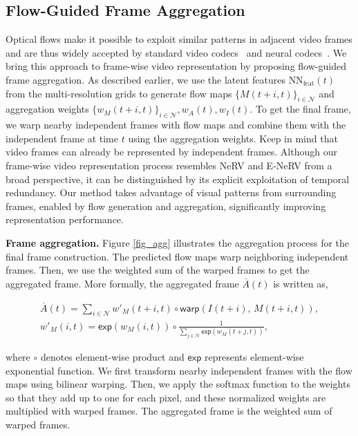 \documentclass[sigconf]{acmart}
\begin{document}
\subsection{Flow-Guided Frame Aggregation}
\label{ssec:flow_guided_agg}
Optical flows make it possible to exploit similar patterns in adjacent video frames and are thus widely accepted by standard video codecs~\cite{h264,hevc} and neural codecs~\cite{dvc,fvc,hybridcomp}.
We bring this approach to frame-wise video representation by proposing flow-guided frame aggregation.
As described earlier, we use the latent features $\textrm{NN}_{\textrm{feat}}(t)$ from the multi-resolution grids to generate flow maps $\{M(t+i,t)\}_{i \in \mathcal{N}}$ and aggregation weights $\{w_M(t+i,t)\}_{i \in \mathcal{N}},w_A(t), w_I(t)$.
To get the final frame, we warp nearby independent frames with flow maps and combine them with the independent frame at time $t$ using the aggregation weights.
Keep in mind that video frames can already be represented by independent frames.
Although our frame-wise video representation process resembles NeRV and E-NeRV from a broad perspective, it can be distinguished by its explicit exploitation of temporal redundancy. 
Our method takes advantage of visual patterns from surrounding frames, enabled by flow generation and aggregation, significantly improving representation performance.


\noindent\textbf{Frame aggregation.} Figure \ref{fig_agg} illustrates the aggregation process for the final frame construction.
The predicted flow maps warp neighboring independent frames.
Then, we use the weighted sum of the warped frames to get the aggregated frame.
More formally, the aggregated frame $\overline{A}(t)$ is written as,
\begin{small}
\begin{equation}
\label{eq:agg}
\begin{gathered}
    \overline{A}(t) = \sum_{i \in \mathcal{N}}w'_M(t+i,t) \circ \mathsf{warp}({I(t+i)},\,M(t+i,t)), \\
    w'_M(i, t) = \mathsf{exp}(w_M(i, t)) \circ \frac{1}{\sum_{j \in \mathcal{N}} \mathsf{exp}(w_M(t+j,t))},
\end{gathered}
\end{equation}
\end{small}
where $\circ$ denotes element-wise product and $\mathsf{exp}$ represents element-wise exponential function.
We first transform nearby independent frames with the flow maps using bilinear warping.
Then, we apply the softmax function to the weights so that they add up to one for each pixel, and these normalized weights are multiplied with warped frames.
The aggregated frame is the weighted sum of warped frames.
\end{document}
